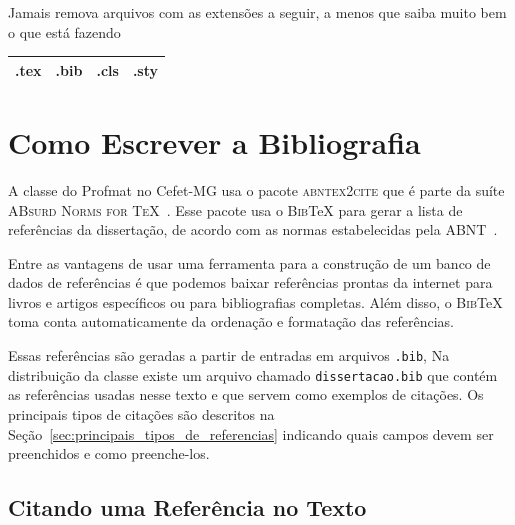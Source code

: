 \documentclass[fleqn]{profmat-cefet}
\newcommand{\BibTeX}   {\textsc{Bib}\TeX}
\newcommand{\bibfile}  {\texttt{dissertacao.bib}}
\begin{document}
Jamais remova arquivos com as extensões a seguir, a menos que saiba muito bem 
o que está fazendo
\begin{center}
    \begin{tabular}{cccc}    \hline
        \textsf{.tex} & \textsf{.bib} & \textsf{.cls} & \textsf{.sty} \\
        \hline
    \end{tabular}
\end{center}

\chapter{Como Escrever a Bibliografia}
\label{cap:como_escrever_a_bibliografia}


A classe do Profmat no Cefet-MG usa o pacote \textsc{abntex2cite}
que é parte da suíte \textsc{ABsurd Norms for TeX}~\cite{ABNTEX}.
Esse pacote usa o \BibTeX{} 
para gerar a lista de referências da dissertação, de acordo com as normas 
estabelecidas pela ABNT~\cite{NBR6023:2000}.

Entre as vantagens de usar uma ferramenta para a construção 
de um banco de dados de referências é que podemos baixar referências prontas da
internet para livros e artigos específicos ou para bibliografias
completas. Além disso, o \BibTeX{} toma conta automaticamente da ordenação
e formatação das referências. 

Essas referências são geradas a partir de entradas em arquivos \texttt{.bib},
Na distribuição da classe existe um arquivo chamado 
\bibfile{} que contém as referências usadas nesse 
texto e que servem como exemplos de citações. 
Os principais tipos de citações são descritos na 
Seção~\ref{sec:principais_tipos_de_referencias} indicando quais campos
devem ser preenchidos e como preenche-los.

\section{Citando uma Referência no Texto}
\label{sec:citando_uma_referencia_no_texto}
\end{document}
